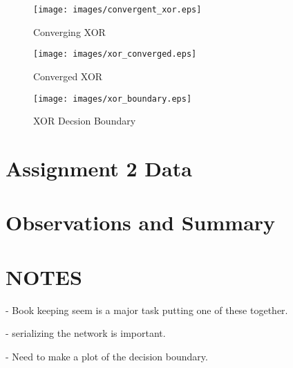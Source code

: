 \documentclass{article}
\begin{document}
\begin{figure}
  \centering
  \texttt{[image: images/convergent\_xor.eps]}
  \caption{Converging XOR}
  \label{fig:xor-converging}
\end{figure}

\begin{figure}
  \centering
  \texttt{[image: images/xor\_converged.eps]}
  \caption{Converged XOR}
  \label{fig:xor-converged}
\end{figure}

\begin{figure}
  \centering
  \texttt{[image: images/xor\_boundary.eps]}
  \caption{XOR Decsion Boundary}
  \label{fig:xor-boundary}
\end{figure}

\section*{Assignment 2 Data}

\section*{Observations and Summary}


\section*{NOTES}


- Book keeping seem is a major task putting one of these together.


- serializing the network is important.


- Need to make a plot of the decision boundary.
\end{document}
